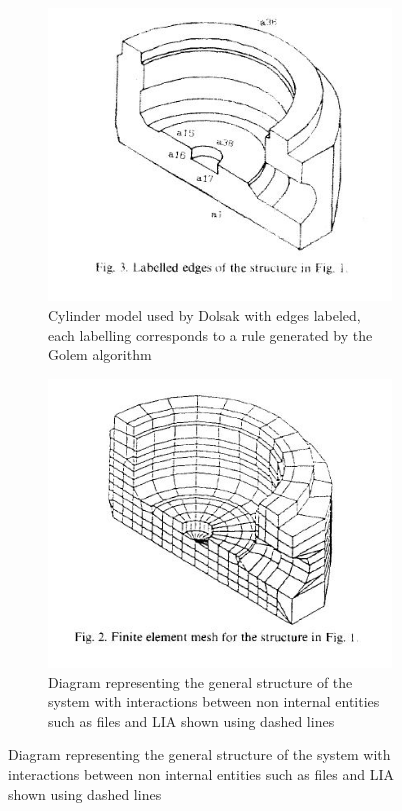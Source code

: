 \begin{figure}
\centering
\begin{subfigure}{.5\textwidth}
  \centering
  \includegraphics[width=0.9\linewidth]{../Graphics/DolsakCylinderWithEdges.jpeg}
  \caption{Cylinder model used by Dolsak with edges labeled, each labelling corresponds to a rule generated by the Golem algorithm \cite{DolsakPaper91}}
  \label{fig:sub1}
\end{subfigure}%
\begin{subfigure}{.5\textwidth}
  \centering
  \includegraphics[width=0.9\linewidth]{../Graphics/DolsakCylinderMeshed.jpeg}
  \caption{Diagram representing the general structure of the system with interactions between non internal entities such as files and LIA shown using dashed lines}
  \label{fig:sub2}
\end{subfigure}
\label{fig:test}
\end{figure}


